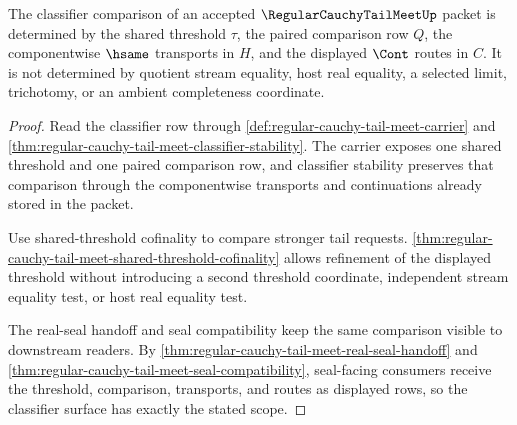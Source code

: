 \begin{theorem}
\label{thm:regular-cauchy-tail-meet-classifier-scope}
The classifier comparison of an accepted $\RegularCauchyTailMeetUp$ packet is determined by the shared threshold $\tau$, the paired comparison row $Q$, the componentwise $\hsame$ transports in $H$, and the displayed $\Cont$ routes in $C$. It is not determined by quotient stream equality, host real equality, a selected limit, trichotomy, or an ambient completeness coordinate.
\end{theorem}
\begin{proof}
Read the classifier row through \autoref{def:regular-cauchy-tail-meet-carrier} and \autoref{thm:regular-cauchy-tail-meet-classifier-stability}. The carrier exposes one shared threshold and one paired comparison row, and classifier stability preserves that comparison through the componentwise transports and continuations already stored in the packet.

Use shared-threshold cofinality to compare stronger tail requests. \autoref{thm:regular-cauchy-tail-meet-shared-threshold-cofinality} allows refinement of the displayed threshold without introducing a second threshold coordinate, independent stream equality test, or host real equality test.

The real-seal handoff and seal compatibility keep the same comparison visible to downstream readers. By \autoref{thm:regular-cauchy-tail-meet-real-seal-handoff} and \autoref{thm:regular-cauchy-tail-meet-seal-compatibility}, seal-facing consumers receive the threshold, comparison, transports, and routes as displayed rows, so the classifier surface has exactly the stated scope.
\end{proof}

